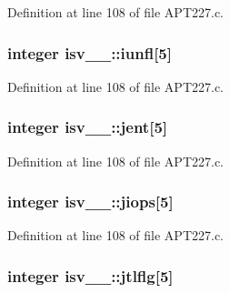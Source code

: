Definition at line 108 of file A\+P\+T227.\+c.

\subsubsection[{\texorpdfstring{iunfl}{iunfl}}]{\setlength{\rightskip}{0pt plus 5cm}integer isv\+\_\+\_\+\+::iunfl\mbox{[}5\mbox{]}}\hypertarget{structisv__1___a5c11187def0859fb59229fe6f85b5021}{}\label{structisv__1___a5c11187def0859fb59229fe6f85b5021}


Definition at line 108 of file A\+P\+T227.\+c.

\subsubsection[{\texorpdfstring{jent}{jent}}]{\setlength{\rightskip}{0pt plus 5cm}integer isv\+\_\+\_\+\+::jent\mbox{[}5\mbox{]}}\hypertarget{structisv__1___ab8e7d6b0c01485584b3eaa39df3b5091}{}\label{structisv__1___ab8e7d6b0c01485584b3eaa39df3b5091}


Definition at line 108 of file A\+P\+T227.\+c.

\subsubsection[{\texorpdfstring{jiops}{jiops}}]{\setlength{\rightskip}{0pt plus 5cm}integer isv\+\_\+\_\+\+::jiops\mbox{[}5\mbox{]}}\hypertarget{structisv__1___ac0f8f87d42758b3b0beccd10d9705482}{}\label{structisv__1___ac0f8f87d42758b3b0beccd10d9705482}


Definition at line 108 of file A\+P\+T227.\+c.

\subsubsection[{\texorpdfstring{jtlflg}{jtlflg}}]{\setlength{\rightskip}{0pt plus 5cm}integer isv\+\_\+\_\+\+::jtlflg\mbox{[}5\mbox{]}}\hypertarget{structisv__1___a77ebe76cd5878ca050835bdb62479f7c}{}\label{structisv__1___a77ebe76cd5878ca050835bdb62479f7c}


